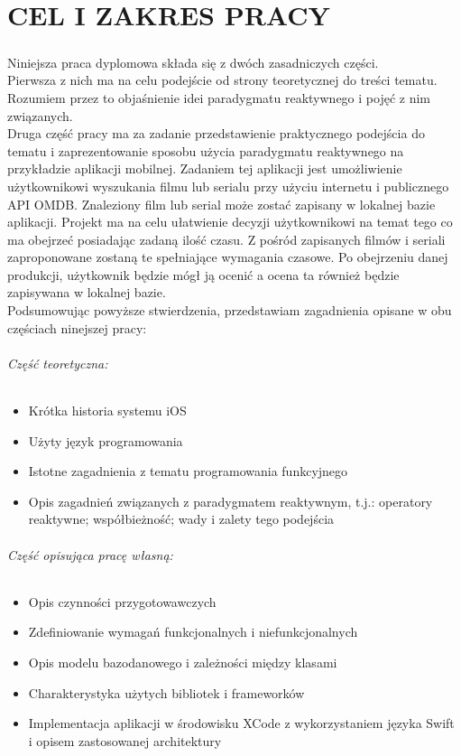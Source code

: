 \documentclass[12pt,oneside,a4paper]{report}
\begin{document}
\chapter{CEL I ZAKRES PRACY}
\paragraph{}Niniejsza praca dyplomowa składa się z dwóch zasadniczych części.\\Pierwsza z nich ma na celu podejście od strony teoretycznej do treści tematu. Rozumiem przez to objaśnienie idei paradygmatu reaktywnego i pojęć z nim związanych.\\Druga część pracy ma za zadanie przedstawienie praktycznego podejścia do tematu i zaprezentowanie sposobu użycia paradygmatu reaktywnego na przykładzie aplikacji mobilnej. Zadaniem tej aplikacji jest umożliwienie użytkownikowi wyszukania filmu lub serialu przy użyciu internetu i publicznego API OMDB. Znaleziony film lub serial może zostać zapisany w lokalnej bazie aplikacji. Projekt ma na celu ułatwienie decyzji użytkownikowi na temat tego co ma obejrzeć posiadając zadaną ilość czasu. Z pośród zapisanych filmów i seriali zaproponowane zostaną te spełniające wymagania czasowe. Po obejrzeniu danej produkcji, użytkownik będzie mógł ją ocenić a ocena ta również będzie zapisywana w lokalnej bazie.\\
Podsumowując powyższe stwierdzenia, przedstawiam zagadnienia opisane w obu częściach ninejszej pracy:
\subparagraph{Część teoretyczna:}
\begin{itemize}
	\item Krótka historia systemu iOS
	\item Użyty język programowania
	\item Istotne zagadnienia z tematu programowania funkcyjnego
	\item Opis zagadnień związanych z paradygmatem reaktywnym, t.j.: operatory reaktywne; współbieżność; wady i zalety tego podejścia
\end{itemize}
\subparagraph{Część opisująca pracę własną:}

\begin{itemize}
	\item Opis czynności przygotowawczych
	\item Zdefiniowanie wymagań funkcjonalnych i niefunkcjonalnych
	\item Opis modelu bazodanowego i zależności między klasami
	\item Charakterystyka użytych bibliotek i frameworków
	\item Implementacja aplikacji w środowisku XCode z wykorzystaniem języka Swift i opisem zastosowanej architektury
\end{itemize}
\end{document}
